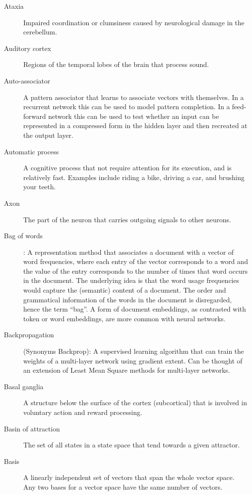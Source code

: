 \begin{description}
\item[Ataxia] Impaired coordination or clumsiness caused by neurological damage in the cerebellum.

\item[Auditory cortex] Regions of the temporal lobes of the brain that process sound. 

\item[Auto-associator] A pattern associator that learns to associate vectors with themselves. In a recurrent network this can be used to model pattern completion. In a feed-forward network this can be used to test whether an input can be represented in a compressed form in the hidden layer and then recreated at the output layer. 

\item[Automatic process] A cognitive process that not require attention for its execution, and is relatively fast. Examples include riding a bike, driving a car, and brushing your teeth.

\item[Axon] The part of the neuron that carries outgoing signals to other neurons.

\item[Bag of words]: A representation method that associates a document with a vector of word frequencies, where each entry of the vector corresponds to a word and the value of the entry corresponds to the number of times that word occurs in the document. The underlying idea is that the word usage frequencies would capture the (semantic) content of a document. The order and grammatical information of the words in the document is disregarded, hence the term ``bag''.  A form of document embeddings, as contrasted with token or word embeddings, are more common with neural networks.

\item[Backpropagation] (Synonyms Backprop): A supervised learning algorithm that can train the weights of a multi-layer network using gradient extent. Can be thought of an extension of Least Mean Square methods for multi-layer networks. 

\item[Basal ganglia] A structure below the surface of the cortex (subcortical) that is involved in voluntary action and reward processing.

\item[Basin of attraction] The set of all states in a state space that tend 
towards a given attractor.

\item[Basis] A linearly independent set of vectors that span the whole vector space. Any two bases for a vector space have the same number of vectors.


\end{description}
